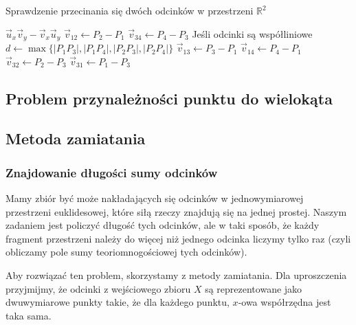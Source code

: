 \begin{algorithm}[H]
	\caption{Sprawdzenie przecinania się dwóch odcinków w przestrzeni $\mathbb{R}^2$}
	\begin{algorithmic}[1]
		\State \Return $\vec{u}_x \vec{v}_y - \vec{v}_x \vec{u}_y$
		\EndProcedure
		\State \Return \true
		\EndIf
		\State $\vec{v}_{12} \gets P_2 - P_1$
		\State $\vec{v}_{34} \gets P_4 - P_3$
		 \Comment Jeśli odcinki są współliniowe
		\State $d \gets \max\{|P_1P_3|, |P_1P_4|, |P_2P_3|, |P_2P_4|\}$
		\State \Return \true
		\EndIf
		\EndIf
		\State $\vec{v}_{13} \gets P_3 - P_1$
		\State $\vec{v}_{14} \gets P_4 - P_1$
		\State \Return \false
		\EndIf
		\State $\vec{v}_{32} \gets P_2 - P_3$
		\State $\vec{v}_{31} \gets P_1 - P_3$
		\State \Return \false
		\EndIf
		\State \Return \true
		\EndProcedure
	\end{algorithmic}
	\label{segment_intersection_r2}
\end{algorithm}


\subsection{Problem przynależności punktu do wielokąta}


\subsection{Metoda zamiatania}
\subsubsection{Znajdowanie długości sumy odcinków}
Mamy zbiór być może nakładających się odcinków w jednowymiarowej przestrzeni euklidesowej, które siłą rzeczy
znajdują się na jednej prostej. Naszym zadaniem jest policzyć długość tych odcinków, ale w taki sposób, że każdy
fragment przestrzeni należy do więcej niż jednego odcinka liczymy tylko raz (czyli obliczamy pole sumy
teoriomnogościowej tych odcinków).

Aby rozwiązać ten problem, skorzystamy z metody zamiatania. Dla
uproszczenia przyjmijmy, że odcinki z wejściowego zbioru $X$ są reprezentowane
jako dwuwymiarowe punkty takie, że dla każdego punktu, $x$-owa
współrzędna jest taka sama.

